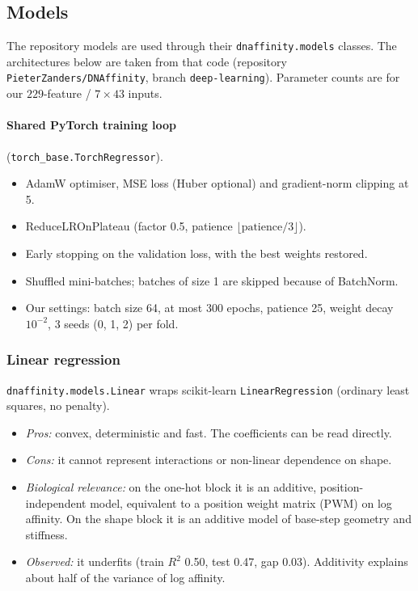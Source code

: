 \subsection{Models}\label{sec:models}
The repository models are used through their \texttt{dnaffinity.models} classes. The architectures below are taken from that code (repository \texttt{PieterZanders/DNAffinity}, branch \texttt{deep-learning}). Parameter counts are for our $229$-feature / $7\times43$ inputs.

\paragraph{Shared PyTorch training loop} (\texttt{torch\_base.TorchRegressor}).
\begin{itemize}
\item AdamW optimiser, MSE loss (Huber optional) and gradient-norm clipping at 5.
\item ReduceLROnPlateau (factor 0.5, patience $\lfloor\text{patience}/3\rfloor$).
\item Early stopping on the validation loss, with the best weights restored.
\item Shuffled mini-batches; batches of size 1 are skipped because of BatchNorm.
\item Our settings: batch size 64, at most 300 epochs, patience 25, weight decay $10^{-2}$, 3 seeds (0, 1, 2) per fold.
\end{itemize}

\subsubsection{Linear regression}
\texttt{dnaffinity.models.Linear} wraps scikit-learn \texttt{LinearRegression} (ordinary least squares, no penalty).
\begin{itemize}
\item \emph{Pros:} convex, deterministic and fast. The coefficients can be read directly.
\item \emph{Cons:} it cannot represent interactions or non-linear dependence on shape.
\item \emph{Biological relevance:} on the one-hot block it is an additive, position-independent model, equivalent to a position weight matrix (PWM) on log affinity. On the shape block it is an additive model of base-step geometry and stiffness.
\item \emph{Observed:} it underfits (train $R^2$ 0.50, test 0.47, gap 0.03). Additivity explains about half of the variance of log affinity.
\end{itemize}

